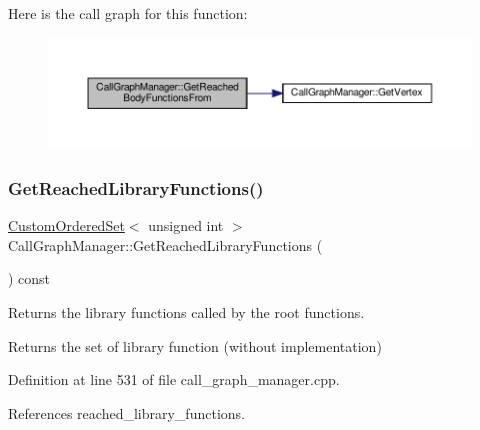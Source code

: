 Here is the call graph for this function\+:
\nopagebreak
\begin{figure}[H]
\begin{center}
\leavevmode
\includegraphics[width=350pt]{d5/d96/classCallGraphManager_ada5792c79efd5eb5646ee1f3fe6651f7_cgraph}
\end{center}
\end{figure}
\mbox{\label{classCallGraphManager_a111b6fd3a5ff50d0fe9ffbbea17f4ea5}} 
\subsubsection{\texorpdfstring{Get\+Reached\+Library\+Functions()}{GetReachedLibraryFunctions()}}
{\footnotesize\ttfamily \hyperlink{classCustomOrderedSet}{Custom\+Ordered\+Set}$<$ unsigned int $>$ Call\+Graph\+Manager\+::\+Get\+Reached\+Library\+Functions (\begin{DoxyParamCaption}{ }\end{DoxyParamCaption}) const}



Returns the library functions called by the root functions. 

\begin{DoxyReturn}{Returns}
the set of library function (without implementation) 
\end{DoxyReturn}


Definition at line 531 of file call\+\_\+graph\+\_\+manager.\+cpp.



References reached\+\_\+library\+\_\+functions.

\mbox{\label{classCallGraphManager_aa915f9088c122e681f0f477eb15e4905}} 
